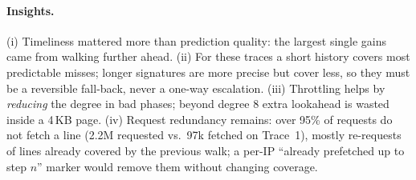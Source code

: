 \documentclass[12pt, a4paper]{article}
\begin{document}
\paragraph{Insights.} (i) Timeliness mattered more than prediction quality:
the largest single gains came from walking further ahead. (ii) For these
traces a short history covers most predictable misses; longer signatures are
more precise but cover less, so they must be a reversible fall-back, never a
one-way escalation. (iii) Throttling helps by \emph{reducing} the degree in bad
phases; beyond degree 8 extra lookahead is wasted inside a 4\,KB page.
(iv) Request redundancy remains: over 95\% of requests do not fetch a line
(2.2M requested vs.\ 97k fetched on Trace~1), mostly re-requests of lines
already covered by the previous walk; a per-IP
``already prefetched up to step $n$'' marker would remove them without changing
coverage.
\end{document}
